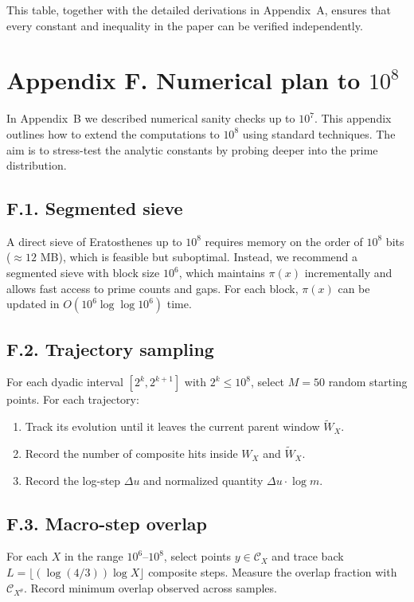 \documentclass[11pt]{article}
\theoremstyle{plain}
\theoremstyle{definition}
\theoremstyle{remark}
\begin{document}
\noindent This table, together with the detailed derivations in Appendix~A, ensures that every constant and inequality in the paper can be verified independently.


\section*{Appendix F. Numerical plan to $10^8$}\label{app:numplan}

In Appendix~B we described numerical sanity checks up to $10^7$. This appendix outlines how to extend the computations to $10^8$ using standard techniques. The aim is to stress-test the analytic constants by probing deeper into the prime distribution.

\subsection*{F.1. Segmented sieve}

A direct sieve of Eratosthenes up to $10^8$ requires memory on the order of $10^8$ bits ($\approx 12$ MB), which is feasible but suboptimal. Instead, we recommend a segmented sieve with block size $10^6$, which maintains $\pi(x)$ incrementally and allows fast access to prime counts and gaps. For each block, $\pi(x)$ can be updated in $O(10^6\log\log 10^6)$ time.

\subsection*{F.2. Trajectory sampling}

For each dyadic interval $[2^k,2^{k+1}]$ with $2^k\leq 10^8$, select $M=50$ random starting points. For each trajectory:
\begin{enumerate}
\item Track its evolution until it leaves the current parent window $\widetilde W_X$.  
\item Record the number of composite hits inside $W_X$ and $\widetilde W_X$.  
\item Record the log-step $\Delta u$ and normalized quantity $\Delta u\cdot \log m$.  
\end{enumerate}

\subsection*{F.3. Macro-step overlap}

For each $X$ in the range $10^6$–$10^8$, select points $y\in\mathcal C_X$ and trace back $L=\lfloor(\log(4/3))\log X\rfloor$ composite steps. Measure the overlap fraction with $\mathcal C_{X^\theta}$. Record minimum overlap observed across samples.
\end{document}
